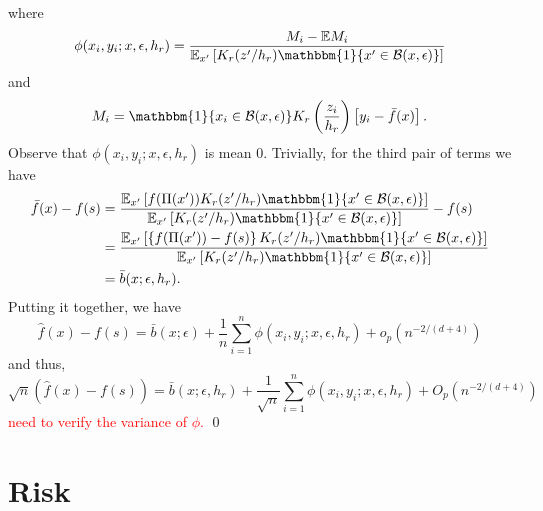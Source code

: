 \documentclass[11pt]{article}
\begin{document}
where 
\begin{equation*}
    \phi(x_i, y_i; x, \epsilon, h_r) = \frac{M_i - \mathbb{E}M_i}{\mathbb{E}_{x'}\left[K_r(z'/h_r)\mathbbm{1}\{x'\in \mathcal{B}(x, \epsilon)\}\right]}
\end{equation*}
and 
\begin{equation}
    M_i = \mathbbm{1}\{x_i \in \mathcal{B}(x, \epsilon)\}K_r\left(\frac{z_i}{h_r}\right)\left[y_i - \bar{f}(x)\right].
\end{equation}
Observe that $\phi(x_i, y_i; x, \epsilon, h_r)$ is mean $0$. 
Trivially, for the third pair of terms we have
\begin{align}
    \bar{f}(x) - f(s) &= \frac{\mathbb{E}_{x'}\left[f(\Pi(x'))K_r(z'/h_r)\mathbbm{1}\{x'\in \mathcal{B}(x, \epsilon)\}\right]}{\mathbb{E}_{x'}\left[K_r(z'/h_r)\mathbbm{1}\{x'\in \mathcal{B}(x, \epsilon)\}\right]} - f(s) \\
    &= \frac{\mathbb{E}_{x'}\left[\left\{f(\Pi(x')) - f(s)\right\}K_r(z'/h_r)\mathbbm{1}\{x'\in \mathcal{B}(x, \epsilon)\}\right]}{\mathbb{E}_{x'}\left[K_r(z'/h_r)\mathbbm{1}\{x'\in \mathcal{B}(x, \epsilon)\}\right]}\\
    &= \bar{b}(x; \epsilon, h_r).
\end{align}
Putting it together, we have 
\begin{equation}
    \hat{f}(x) - f(s) = \bar{b}(x; \epsilon) + \frac{1}{n}\sum_{i = 1}^n\phi (x_i, y_i; x, \epsilon, h_r) + o_p(n^{-2/(d+4)})
\end{equation}
and thus,
\begin{equation}
    \sqrt{n}(\hat{f}(x) - f(s)) = \bar{b}(x; \epsilon, h_r) + \frac{1}{\sqrt{n}}\sum_{i = 1}^n\phi (x_i, y_i; x, \epsilon, h_r) + O_p(n^{-2/(d+4)})
\end{equation}
\textcolor{red}{need to verify the variance of $\phi$.}
\qed{}

\section{Risk}
\end{document}

